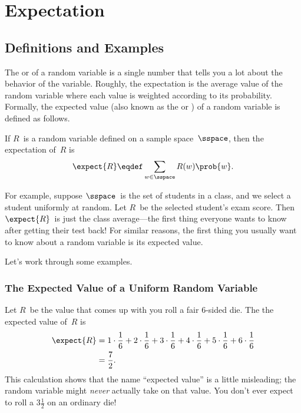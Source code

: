 \chapter{Expectation}\label{chap:expectation}

\begin{problems}
\classproblems
{}

\end{problems}

\section{Definitions and Examples}

The  or  of a random variable
is a single number that tells you a lot about the behavior of the
variable.  Roughly, the expectation is the average value of the random
variable where each value is weighted according to its probability.
Formally, the expected value (also known as the  or
) of a random variable is defined as follows.

\begin{definition}\label{def:expectation}
If $R$~is a random variable defined on a sample space~$\sspace$, then
the expectation of~$R$ is
\begin{equation}\label{eqn:expectation}
    \expect{R} \eqdef \sum_{w \in \sspace} R(w) \prob{w}.
\end{equation}
\end{definition}

For example, suppose $\sspace$~is the set of students in a class, and
we select a student uniformly at random.  Let $R$~be the selected
student's exam score.  Then $\expect{R}$~is just the class
average---the first thing everyone wants to know after getting their
test back!  For similar reasons, the first thing you usually want to
know about a random variable is its expected value.

Let's work through some examples.

\subsection{The Expected Value of a Uniform Random Variable}

Let $R$~be the value that comes up with you roll a fair 6-sided die.
The the expected value of~$R$ is
\begin{align*}
\expect{R}
    & = 1 \cdot \frac{1}{6} + 2 \cdot \frac{1}{6} + 3 \cdot \frac{1}{6} +
        4 \cdot \frac{1}{6} + 5 \cdot \frac{1}{6} + 6 \cdot \frac{1}{6} \\
    & = \frac{7}{2}.
\end{align*}
%
This calculation shows that the name ``expected value'' is a little
misleading; the random variable might \emph{never} actually take on that
value.  You don't ever expect to roll a $3 \frac{1}{2}$ on an ordinary
die!

